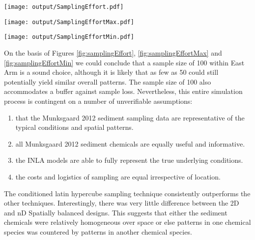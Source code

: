 \documentclass[a4paper]{article}
\let\origfigure=\figure
\let\endorigfigure=\endfigure
\renewenvironment{figure}[1][]{%
   \origfigure[H]
}{%
   \endorigfigure
}
\begin{document}
\begin{figure}
\centering\scriptsize
\texttt{[image: output/SamplingEffort.pdf]}
\caption{Comparison of the mean Error conditional on sample size and
sampling method for the East Arm\label{fig:samplingEffort}}
\end{figure}

\begin{figure}
\centering\scriptsize
\texttt{[image: output/SamplingEffortMax.pdf]}
\caption{Comparison of the maximum Error conditional on sample size and
sampling method for the East Arm\label{fig:samplingEffortMax}}
\end{figure}

\begin{figure}
\centering\scriptsize
\texttt{[image: output/SamplingEffortMin.pdf]}
\caption{Comparison of the minimum Error conditional on sample size and
sampling method for the East Arm\label{fig:samplingEffortMin}}
\end{figure}

On the basis of Figures \ref{fig:samplingEffort},
\ref{fig:samplingEffortMax} and \ref{fig:samplingEffortMin} we could
conclude that a sample size of 100 within East Arm is a sound choice,
although it is likely that as few as 50 could still potentially yield
similar overall patterns. The sample size of 100 also accommodates a
buffer against sample loss. Nevertheless, this entire simulation process
is contingent on a number of unverifiable assumptions:

\begin{enumerate}
\def\labelenumi{\arabic{enumi}.}
\tightlist
\item
  that the Munksgaard 2012 sediment sampling data are representative of
  the typical conditions and spatial patterns.
\item
  all Munksgaard 2012 sediment chemicals are equally useful and
  informative.
\item
  the INLA models are able to fully represent the true underlying
  conditions.
\item
  the costs and logistics of sampling are equal irrespective of
  location.
\end{enumerate}

The conditioned latin hypercube sampling technique consistently
outperforms the other techniques. Interestingly, there was very little
difference between the 2D and nD Spatially balanced designs. This
suggests that either the sediment chemicals were relatively homogeneous
over space or else patterns in one chemical species was countered by
patterns in another chemical species.
\end{document}
